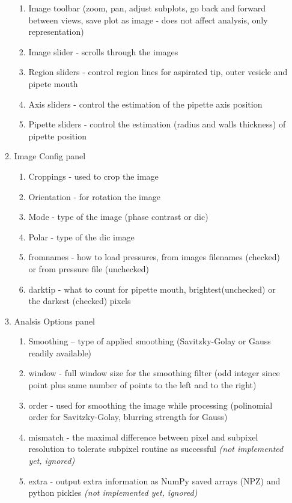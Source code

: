 \begin{itemize}
\begin{enumerate}
\begin{enumerate}
						\item Image toolbar (zoom, pan, adjust subplots, go back and forward between views, save plot as image - does not affect analysis, only representation)
						\item Image slider - scrolls through the images
						\item Region sliders - control region lines for aspirated tip, outer vesicle and pipete mouth
						\item Axis sliders - control the estimation of the pipette axis position
						\item Pipette sliders - control the estimation (radius and walls thickness) of pipette position
					\end{enumerate}
				\item Image Config panel
					\begin{enumerate}
						\item Croppings - used to crop the image
						\item Orientation - for rotation the image
						\item Mode - type of the image (phase contrast or dic)
						\item Polar - type of the dic image
						\item fromnames - how to load pressures, from images filenames (checked) or from pressure file (unchecked)
						\item darktip - what to count for pipette mouth, brightest(unchecked) or the darkest (checked) pixels
					\end{enumerate}
				\item Analsis Options panel
					\begin{enumerate}
						\item Smoothing -- type of applied smoothing (Savitzky-Golay or Gauss readily available)
						\item window - full window size for the smoothing filter (odd integer since point plus same number of points to the left and to the right)
						\item order - used for smoothing the image while processing (polinomial order for Savitzky-Golay, blurring strength for Gauss)
						\item mismatch - the maximal difference between pixel and subpixel resolution to tolerate subpixel routine as successful \emph{(not implemented yet, ignored)}
						\item extra - output extra information as NumPy saved arrays (NPZ) and python pickles \emph{(not implemented yet, ignored)}

\end{enumerate}
\end{enumerate}
\end{itemize}

